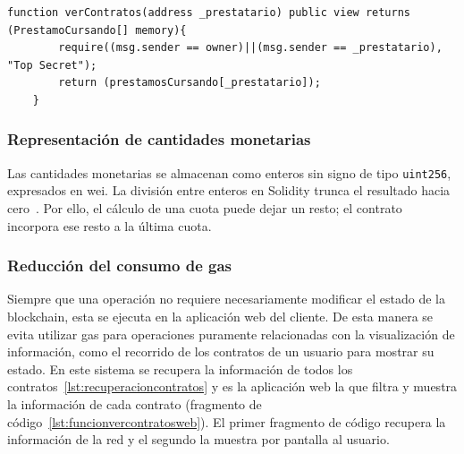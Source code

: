 \begin{lstlisting}[language=Solidity, caption={Función que devuelve los contratos de un usuario},label={lst:funcionvercontratos}]
     function verContratos(address _prestatario) public view returns (PrestamoCursando[] memory){
        require((msg.sender == owner)||(msg.sender == _prestatario), "Top Secret");
        return (prestamosCursando[_prestatario]);
    }
\end{lstlisting}

\subsubsection{Representación de cantidades monetarias} 
Las cantidades monetarias se almacenan como enteros sin signo de tipo
\texttt{uint256}, expresados en \gls{wei}. La división entre enteros en Solidity
trunca el resultado hacia cero~\cite{solidityTipos}. Por ello, el cálculo de una
cuota puede dejar un resto; el contrato incorpora ese resto a la última cuota.


\subsubsection{Reducción del consumo de gas} 
Siempre que una operación no requiere necesariamente modificar el estado de 
la blockchain, esta se ejecuta en la aplicación web del cliente. 
De esta manera se evita utilizar \gls{gas} para operaciones puramente 
relacionadas con la visualización de información, como el recorrido de los 
contratos de un usuario para mostrar su estado. 
En este sistema se recupera la información de todos los contratos~\ref{lst:recuperacioncontratos} 
 y es la 
aplicación web la que filtra y muestra la información de cada contrato (fragmento de código~\ref{lst:funcionvercontratosweb}). El primer fragmento de código recupera la información de la red
y el segundo la muestra por pantalla al usuario.


